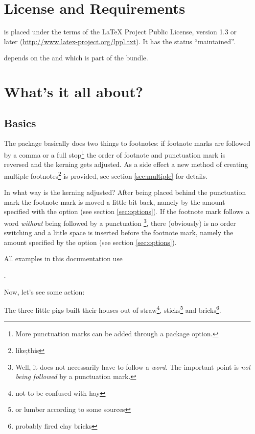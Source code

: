 \documentclass[toc=index,toc=bib]{cnpkgdoc}
\newcommand\setapart[1]{\medskip\hspace{1em}#1\medskip}
\begin{document}
\section{License and Requirements}
\fnpct is placed under the terms of the LaTeX Project Public License,
version 1.3 or later (\url{http://www.latex-project.org/lppl.txt}).
It has the status \enquote{maintained}.

\fnpct depends on the  and  which is part of the
 bundle.

\section{What's it all about?}
\subsection{Basics}
The \fnpct package basically does two things to footnotes: if footnote marks are
followed by a comma or a full stop\footnote{More punctuation marks can be added
through a package option.} the order of footnote and punctuation mark is
reversed and the kerning gets adjusted. As a side effect a new method of creating
multiple footnotes\footnote{like;this} is provided, see section \ref{sec:multiple}
for details.

In what way is the kerning adjusted? After being placed behind the punctuation
mark the footnote mark is moved a little bit back, namely by the amount specified
with the option  (see section \ref{sec:options}). If the
footnote mark follows a word \emph{without} being followed by a punctuation%
\footnote{Well, it does not necessarily have to follow a \emph{word}. The important
point is \emph{not being followed} by a punctuation mark.}, there (obviously) is
no order switching and a little space is inserted before the footnote mark, namely
the amount specified by the option  (see section
\ref{sec:options}).

All examples in this documentation use

\setapart{\cmd{thempfootnote}{\cmd{arabic}{mpfootnote}}}.

Now, let's see some action:
\begin{beispiel}
 \begin{minipage}{.4\linewidth}
  \noindent The three little pigs built their houses
  out of straw\footnote{not to be confused with hay},
  sticks\footnote{or lumber according to some sources}
  and bricks\footnote{probably fired clay bricks}.
 \end{minipage}
\end{beispiel}
\end{document}

